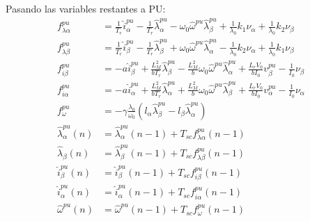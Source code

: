 \documentclass{article}
\begin{document}
            Pasando las variables restantes a PU:
            \begin{equation}
                \begin{aligned}
                    f_{\lambda\alpha}^{pu} &=  \frac{1}{T_r}  \hat{i}_\alpha^{pu}
                        - \frac{1}{T_r} \hat{\lambda}_\alpha^{pu}  
                        - \omega_0 \hat{\omega}^{pu} \hat{\lambda}_\beta^{pu} 
                        + \frac{1}{\lambda_0} k_1\nu_\alpha + \frac{1}{\lambda_0} k_2\nu_\beta  \\
                    f_{\lambda\beta}^{pu} &=  \frac{1}{T_r}  \hat{i}_\beta^{pu} 
                        - \frac{1}{T_r} \hat{\lambda}_\beta^{pu}  
                        + \omega_0 \hat{\omega}^{pu} \hat{\lambda}_\alpha^{pu} 
                        - \frac{1}{\lambda_0} k_2\nu_\alpha + \frac{1}{\lambda_0} k_1\nu_\beta  \\
                    f_{i\beta}^{pu} &=  -a  \hat{i}_\beta^{pu} 
                        + \frac{L_M^2}{b T_r}  \hat{\lambda}_\beta^{pu}  
                        - \frac{L_M^2}{b} \omega_0   \hat{\omega}^{pu} \hat{\lambda}_\alpha^{pu}
                        + \frac{L_r V_0}{b I_0} v_\beta^{pu} 
                        - \frac{1}{I_0} \nu_\beta \\
                    f_{i\alpha}^{pu} &=  -a  \hat{i}_\alpha^{pu} 
                        + \frac{L_M^2}{b T_r}  \hat{\lambda}_\alpha^{pu}  
                        +  \frac{L_M^2}{b} \omega_0  \hat{\omega}^{pu} \hat{\lambda}_\beta^{pu}
                        + \frac{L_r V_0}{b I_0} v_\alpha^{pu}
                        - \frac{1}{I_0} \nu_\alpha \\
                    f_\omega^{pu} &=  -\gamma \frac{\lambda_0}{\omega_0} 
                        \left( 
                            l_\alpha \hat{\lambda}_\beta^{pu} 
                            - l_\beta \hat{\lambda}_\alpha^{pu}  
                        \right) \\
                    \hat{\lambda}_\alpha^{pu}(n) &= \hat{\lambda}_\alpha^{pu}(n-1)
                        + T_{sc}  f_{\lambda\alpha}^{pu}(n-1)  \\
                    \hat{\lambda}_\beta(n) &= \hat{\lambda}_\beta^{pu}(n-1)
                        + T_{sc}  f_{\lambda\beta}^{pu}(n-1) \\
                    \hat{i}_\beta^{pu}(n) &= \hat{i}_\beta^{pu}(n-1)
                        + T_{sc}  f_{i\beta}^{pu}(n-1) \\
                    \hat{i}_\alpha^{pu}(n) &= \hat{i}_\alpha^{pu}(n-1) 
                        + T_{sc}  f_{i\alpha}^{pu}(n-1) \\
                    \hat{\omega}^{pu}(n) &= \hat{\omega}^{pu}(n-1)
                        + T_{sc}  f_{\omega}^{pu}(n-1)  
                \end{aligned}
            \end{equation}
\end{document}
